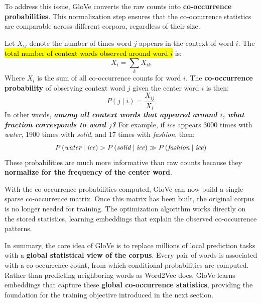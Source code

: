\highspace
\textcolor{Green3}{} To address this issue, GloVe converts the raw counts into \textbf{co-occurrence probabilities}. This normalization step ensures that the co-occurrence statistics are comparable across different corpora, regardless of their size.

\highspace
Let $X_{ij}$ denote the number of times word $j$ appears in the context of word $i$. The \hl{total number of context words observed around word $i$} is:
\begin{equation}
    X_i = \sum_{k} X_{ik}
\end{equation}
Where $X_i$ is the sum of all co-occurrence counts for word $i$. The \textbf{co-occurrence probability} of observing context word $j$ given the center word $i$ is then:
\begin{equation}\label{eq:co-occurrence-probability}
    P\left(j \mid i\right) = \frac{X_{ij}}{X_i}
\end{equation}
In other words, \emph{\textbf{among all context words that appeared around $i$, what fraction corresponds to word $j$?}} For example, if \emph{ice} appears 3000 times with \emph{water}, 1900 times with \emph{solid}, and 17 times with \emph{fashion}, then:
\begin{equation*}
    P\left(\emph{water} \mid \emph{ice}\right) > P\left(\emph{solid} \mid \emph{ice}\right) \gg P\left(\emph{fashion} \mid \emph{ice}\right)
\end{equation*}
These probabilities are much more informative than raw counts because they \textbf{normalize for the frequency of the center word}.

\highspace
With the co-occurrence probabilities computed, GloVe can now build a single sparse co-occurrence matrix. Once this matrix has been built, the original corpus is no longer needed for training. The optimization algorithm works directly on the stored statistics, learning embeddings that explain the observed co-occurrence patterns.

\highspace
In summary, the core idea of GloVe is to replace millions of local prediction tasks with a \textbf{global statistical view of the corpus}. Every pair of words is associated with a co-occurrence count, from which conditional probabilities are computed. Rather than predicting neighboring words as Word2Vec does, GloVe learns embeddings that capture these \textbf{global co-occurrence statistics}, providing the foundation for the training objective introduced in the next section.
